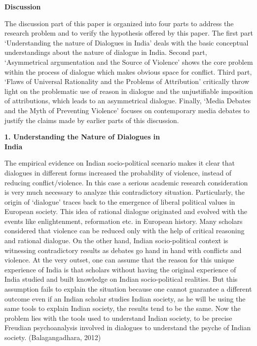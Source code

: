 \begin{multicols}{2}
\noi
{\normalsize\bfseries Discussion}

\noi
The discussion part of this paper is organized into four parts to address the research problem and
to verify the hypothesis offered by this paper. The first part ‘Understanding the nature of
Dialogues in India’ deals with the basic conceptual understandings about the nature of dialogue
in India. Second part, ‘Asymmetrical argumentation and the Source of Violence’ shows the core
problem within the process of dialogue which makes obvious space for conflict. Third part, ‘Flaws
of Universal Rationality and the Problems of Attribution’ critically throw light on the problematic
use of reason in dialogue and the unjustifiable imposition of attributions, which leads to an
asymmetrical dialogue. Finally, ‘Media Debates and the Myth of Preventing Violence’ focuses
on contemporary media debates to justify the claims made by earlier parts of this discussion.

\noi
{\large \bfseries 1. Understanding the Nature of Dialogues in\\ India}

\noi
The empirical evidence on Indian socio-political scenario makes it clear that dialogues in different
forms increased the probability of violence, instead of reducing conflict/violence. In this case a
serious academic research consideration is very much necessary to analyze this contradictory
situation. Particularly, the origin of ‘dialogue’ traces back to the emergence of liberal political
values in European society. This idea of rational dialogue originated and evolved with the events
like enlightenment, reformation etc. in European history. Many scholars considered that violence
can be reduced only with the help of critical reasoning and rational dialogue. On the other hand,
Indian socio-political context is witnessing contradictory results as debates go hand in hand with
conflicts and violence. At the very outset, one can assume that the reason for this unique
experience of India is that scholars without having the original experience of India studied and
built knowledge on Indian socio-political realities. But this assumption fails to explain the
situation because one cannot guarantee a different outcome even if an Indian scholar studies
Indian society, as he will be using the same tools to explain Indian society, the results tend to be
the same. Now the problem lies with the tools used to understand Indian society, to be precise Freudian psychoanalysis involved in dialogues to understand the psyche of Indian society.
(Balagangadhara, 2012)


\end{multicols}
